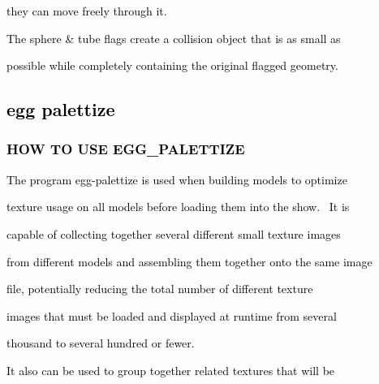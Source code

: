 \documentclass[a4paper]{article}
\newcommand\textstyleOOoComputerKeyWord[1]{\textrm{\textcolor[rgb]{0.0,0.0,0.5019608}{#1}}}
\begin{document}
{\color{black}
\textstyleOOoComputerKeyWord{\textcolor{black}{they can move freely through it.}}}


\bigskip

{\color{black}
\textstyleOOoComputerKeyWord{\textcolor{black}{The sphere \& tube flags create a collision object that is as small as}}}

{\color{black}
\textstyleOOoComputerKeyWord{\textcolor{black}{possible while completely containing the original flagged geometry.}}}

\clearpage\subsection[egg palettize]{\textstyleOOoComputerKeyWord{\textcolor{black}{egg palettize}}}
\hypertarget{RefHeading7658869075401}{}\subsubsection[HOW TO USE
EGG\_PALETTIZE]{\textstyleOOoComputerKeyWord{\textcolor{black}{HOW TO USE EGG\_PALETTIZE}}}
\hypertarget{RefHeading7660869075401}{}
\bigskip

{\color{black}
\textstyleOOoComputerKeyWord{\textcolor{black}{The program egg-palettize is used when building models to optimize}}}

{\color{black}
\textstyleOOoComputerKeyWord{\textcolor{black}{texture usage on all models before loading them into the show. \ It is}}}

{\color{black}
\textstyleOOoComputerKeyWord{\textcolor{black}{capable of collecting together several different small texture images}}}

{\color{black}
\textstyleOOoComputerKeyWord{\textcolor{black}{from different models and assembling them together onto the same image}}}

{\color{black}
\textstyleOOoComputerKeyWord{\textcolor{black}{file, potentially reducing the total number of different texture}}}

{\color{black}
\textstyleOOoComputerKeyWord{\textcolor{black}{images that must be loaded and displayed at runtime from several}}}

{\color{black}
\textstyleOOoComputerKeyWord{\textcolor{black}{thousand to several hundred or fewer.}}}


\bigskip

{\color{black}
\textstyleOOoComputerKeyWord{\textcolor{black}{It also can be used to group together related textures that will be}}}
\end{document}

